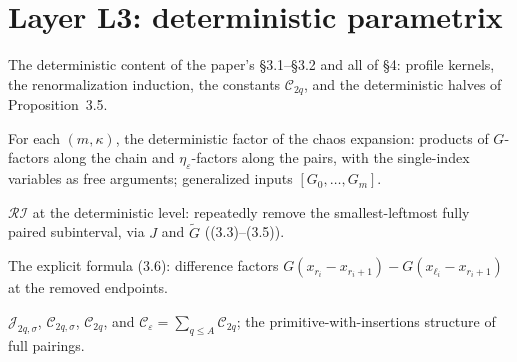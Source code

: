 \chapter{Layer L3: deterministic parametrix}\label{ch:detparametrix}

The deterministic content of the paper's \S3.1--\S3.2 and all of \S4:
profile kernels, the renormalization induction, the constants
\(\mathcal{C}_{2q}\), and the deterministic halves of Proposition~3.5.

\begin{definition}\label{D-Kdet}
  \leanok
  For each \((m,\kappa)\), the deterministic factor of the chaos
  expansion: products of \(G\)-factors along the chain and
  \(\eta_\varepsilon\)-factors along the pairs, with the single-index
  variables as free arguments; generalized inputs
  \([G_0,\dots,G_m]\).
\end{definition}

\begin{definition}\label{D-RI}
  \leanok
  \(\mathcal{RI}\) at the deterministic level: repeatedly remove the
  smallest-leftmost fully paired subinterval, via \(J\) and
  \(\widetilde G\) ((3.3)--(3.5)).
\end{definition}

\begin{proposition}\label{P-3.2}
  \leanok
  The explicit formula (3.6): difference factors
  \(G(x_{r_i} - x_{r_i+1}) - G(x_{\ell_i} - x_{r_i+1})\) at the removed
  endpoints.
\end{proposition}

\begin{definition}\label{D-C2q}
  \leanok
  \(\mathcal{J}_{2q,\sigma}\), \(\mathcal{C}_{2q,\sigma}\),
  \(\mathcal{C}_{2q}\), and
  \(\mathcal{C}_\varepsilon = \sum_{q\le A}\mathcal{C}_{2q}\); the
  primitive-with-insertions structure of full pairings.
\end{definition}

